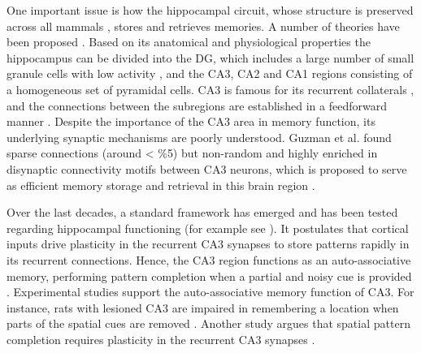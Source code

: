 \documentclass[utf8]{frontiersSCNS} %
\begin{document}
One important issue is how the hippocampal circuit, whose structure is preserved across all mammals \cite{allen2013evolution}, stores and retrieves memories. A number of theories have been proposed \cite{treves1992computational, marr1991simple, mcclelland1995there, HIPO:HIPO450020209}. 
Based on its anatomical and physiological properties the hippocampus can be divided into the DG, which includes a large number of small granule cells with low activity \cite{leutgeb2007pattern}, and the CA3, CA2 and CA1 regions consisting of a homogeneous set of pyramidal cells. CA3 is famous for its recurrent collaterals \cite{ishizuka1990organization, li1994hippocampal}, and the connections between the subregions are established in a feedforward manner \cite{amaral1990chapter}.
%
Despite the importance of the CA3 area in memory function, its underlying synaptic mechanisms are poorly understood. Guzman et al. found sparse connections (around < $\%$5) but non-random and highly enriched in disynaptic connectivity motifs between CA3 neurons, which is proposed to serve as efficient memory storage and retrieval in this brain region \cite{guzman2016synaptic}. 


Over the last decades, a standard framework has emerged and has been tested regarding hippocampal functioning (for example see \cite{fontanari1995model}). It postulates that cortical inputs drive plasticity in the recurrent CA3 synapses to store patterns rapidly in its recurrent connections. Hence, the CA3 region functions as an auto-associative memory, performing pattern completion when a partial and noisy cue is provided \cite{marr1991simple, mcnaughton1987hippocampal, treves1994computational, o1994hippocampal, rolls2007attractor, guzman2016synaptic}. Experimental studies support the auto-associative memory function of CA3. For instance, rats with lesioned CA3 are impaired in remembering a location when parts of the spatial cues are removed \cite{gold2005role}. Another study argues that spatial pattern completion requires plasticity in the recurrent CA3 synapses \cite{nakazawa2002requirement}. 
\end{document}
